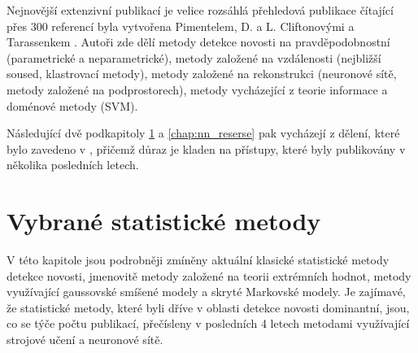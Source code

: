 \par
Nejnovější extenzivní publikací je velice rozsáhlá přehledová publikace čítající přes 300 referencí byla vytvořena Pimentelem, D. a L. Cliftonovými a Tarassenkem \cite{pimentel}. Autoři zde dělí metody detekce novosti na pravděpodobnostní (parametrické a neparametrické), metody založené na vzdálenosti (nejbližší soused, klastrovací metody), metody založené na rekonstrukci (neuronové sítě, metody založené na podprostorech), metody vycházející z teorie informace a doménové metody (SVM).
\par
Následující dvě podkapitoly \ref{chap:stat_reserse} a \ref{chap:nn_reserse} pak vycházejí z dělení, které bylo zavedeno v \cite{markou1,markou2}, přičemž důraz je kladen na přístupy, které byly publikovány v několika posledních letech.
\section{Vybrané statistické metody}\label{chap:stat_reserse}
V této kapitole jsou podrobněji zmíněny aktuální klasické statistické metody detekce novosti, jmenovitě metody založené na teorii extrémních hodnot, metody využívající gaussovské smíšené modely a skryté Markovské modely. Je zajímavé, že statistické metody, které byli dříve v oblasti detekce novosti dominantní, jsou, co se týče počtu publikací, přečísleny v posledních 4 letech metodami využívající strojové učení a neuronové sítě.
